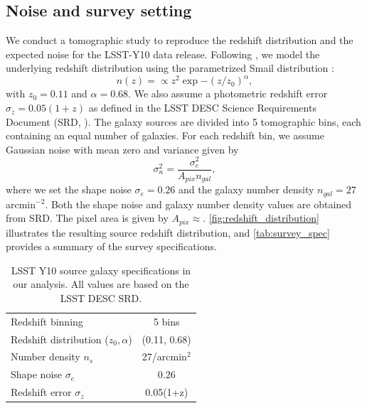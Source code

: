 \documentclass{aa}
\begin{document}
\subsection{Noise and survey setting}
We conduct a tomographic study to reproduce the redshift distribution and the expected noise for the LSST-Y10 data release.
Following \citet{zhang2022transitioning}, we model the underlying redshift distribution using the parametrized Smail distribution \citep{smail1995deep}:
\begin{equation}
    n(z)=\propto z^2 \exp{-(z/z_0)^{\alpha}},
\end{equation}
with $z_0=0.11$ and $\alpha=0.68$. We also assume a photometric redshift error $\sigma_z=0.05(1+z)$ as defined in the LSST DESC Science Requirements Document (SRD, \citet{mandelbaum2018lsst}).
The galaxy sources are divided into 5 tomographic bins, each containing an equal number of galaxies. 
For each redshift bin, we assume Gaussian noise with mean zero and variance given by
 \begin{equation}
     \sigma^2_n= \frac{\sigma_e^2}{A_{pix}n_{gal}},
 \end{equation}
where we set the shape noise $\sigma_e = 0.26$ and the galaxy number density $n_{gal}=27$ arcmin$^{-2}$. Both the shape noise and galaxy number density values are obtained from SRD. The pixel area is given by $A_{pix}\approx$. 
\autoref{fig:redshift_distribution} illustrates the resulting source redshift distribution, and \autoref{tab:survey_spec} provides a summary of the survey specifications.
\begin{table}
	\centering
	\caption{ LSST Y10 source galaxy specifications in our analysis. All values are based on the LSST DESC SRD.}
	\begin{tabular}{lc} 
             \hline \hline
		Redshift binning & 5 bins \\
		Redshift distribution ($z_{0}, \alpha$) & (0.11, 0.68)  \\
		Number density $n_s$ & 27/arcmin$^2$ \\
		Shape noise $\sigma_e$ & 0.26 \\
		Redshift error $\sigma_z$ &0.05(1+z)  \\
		\hline
	\end{tabular}
	\label{tab:survey_spec}
\end{table}
\end{document}
